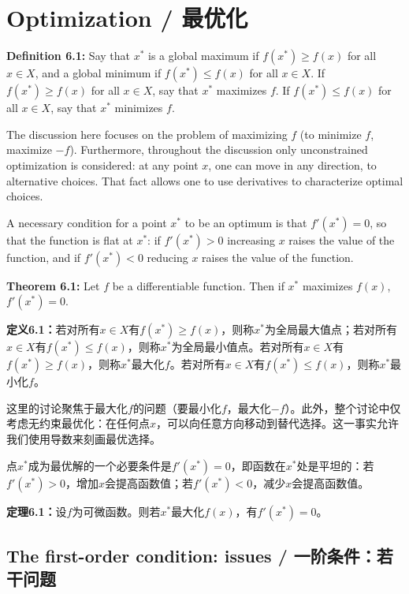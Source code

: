 \section{Optimization / 最优化}

\begin{original}
\textbf{Definition 6.1:} Say that $x^*$ is a global maximum if $f(x^*) \ge f(x)$ for all $x \in X$, and a global minimum if $f(x^*) \le f(x)$ for all $x \in X$. If $f(x^*) \ge f(x)$ for all $x \in X$, say that $x^*$ maximizes $f$. If $f(x^*) \le f(x)$ for all $x \in X$, say that $x^*$ minimizes $f$.

The discussion here focuses on the problem of maximizing $f$ (to minimize $f$, maximize $-f$). Furthermore, throughout the discussion only unconstrained optimization is considered: at any point $x$, one can move in any direction, to alternative choices. That fact allows one to use derivatives to characterize optimal choices.

A necessary condition for a point $x^*$ to be an optimum is that $f'(x^*) = 0$, so that the function is flat at $x^*$: if $f'(x^*) > 0$ increasing $x$ raises the value of the function, and if $f'(x^*) < 0$ reducing $x$ raises the value of the function.

\textbf{Theorem 6.1:} Let $f$ be a differentiable function. Then if $x^*$ maximizes $f(x)$, $f'(x^*) = 0$.
\end{original}
\begin{translation}
\textbf{定义6.1：}若对所有$x \in X$有$f(x^*) \ge f(x)$，则称$x^*$为全局最大值点；若对所有$x \in X$有$f(x^*) \le f(x)$，则称$x^*$为全局最小值点。若对所有$x \in X$有$f(x^*) \ge f(x)$，则称$x^*$最大化$f$。若对所有$x \in X$有$f(x^*) \le f(x)$，则称$x^*$最小化$f$。

这里的讨论聚焦于最大化$f$的问题（要最小化$f$，最大化$-f$）。此外，整个讨论中仅考虑无约束最优化：在任何点$x$，可以向任意方向移动到替代选择。这一事实允许我们使用导数来刻画最优选择。

点$x^*$成为最优解的一个必要条件是$f'(x^*) = 0$，即函数在$x^*$处是平坦的：若$f'(x^*) > 0$，增加$x$会提高函数值；若$f'(x^*) < 0$，减少$x$会提高函数值。

\textbf{定理6.1：}设$f$为可微函数。则若$x^*$最大化$f(x)$，有$f'(x^*) = 0$。
\end{translation}

\subsection{The first-order condition: issues / 一阶条件：若干问题}

